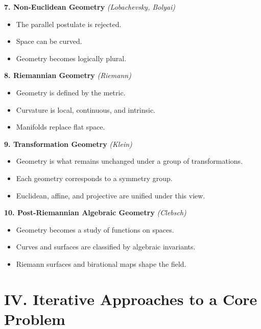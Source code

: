 \documentclass[9pt]{article}
\begin{document}
\bigskip

\textbf{7. Non-Euclidean Geometry} \hfill \textit{(Lobachevsky, Bolyai)}

\begin{itemize}
  \item The parallel postulate is rejected.
  \item Space can be curved.
  \item Geometry becomes logically plural.
\end{itemize}

\bigskip

\textbf{8. Riemannian Geometry} \hfill \textit{(Riemann)}

\begin{itemize}
  \item Geometry is defined by the metric.
  \item Curvature is local, continuous, and intrinsic.
  \item Manifolds replace flat space.
\end{itemize}

\bigskip

\textbf{9. Transformation Geometry} \hfill \textit{(Klein)}

\begin{itemize}
  \item Geometry is what remains unchanged under a group of transformations.
  \item Each geometry corresponds to a symmetry group.
  \item Euclidean, affine, and projective are unified under this view.
\end{itemize}

\bigskip

\textbf{10. Post-Riemannian Algebraic Geometry} \hfill \textit{(Clebsch)}

\begin{itemize}
  \item Geometry becomes a study of functions on spaces.
  \item Curves and surfaces are classified by algebraic invariants.
  \item Riemann surfaces and birational maps shape the field.
\end{itemize}


\newpage

\section*{IV. Iterative Approaches to a Core Problem}
\end{document}

